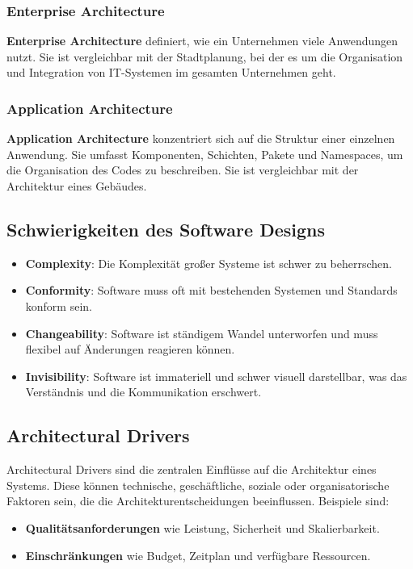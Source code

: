\subsubsection{Enterprise Architecture}

\textbf{Enterprise Architecture} definiert, wie ein Unternehmen viele Anwendungen nutzt. Sie ist vergleichbar mit der Stadtplanung, bei der es um die Organisation und Integration von IT-Systemen im gesamten Unternehmen geht.

\subsubsection{Application Architecture}

\textbf{Application Architecture} konzentriert sich auf die Struktur einer einzelnen Anwendung. Sie umfasst Komponenten, Schichten, Pakete und Namespaces, um die Organisation des Codes zu beschreiben. Sie ist vergleichbar mit der Architektur eines Gebäudes.

\subsection{Schwierigkeiten des Software Designs}

\begin{itemize}
    \item \textbf{Complexity}: Die Komplexität großer Systeme ist schwer zu beherrschen.
    \item \textbf{Conformity}: Software muss oft mit bestehenden Systemen und Standards konform sein.
    \item \textbf{Changeability}: Software ist ständigem Wandel unterworfen und muss flexibel auf Änderungen reagieren können.
    \item \textbf{Invisibility}: Software ist immateriell und schwer visuell darstellbar, was das Verständnis und die Kommunikation erschwert.
\end{itemize}

\subsection{Architectural Drivers}

Architectural Drivers sind die zentralen Einflüsse auf die Architektur eines Systems. Diese können technische, geschäftliche, soziale oder organisatorische Faktoren sein, die die Architekturentscheidungen beeinflussen. Beispiele sind:

\begin{itemize}
    \item \textbf{Qualitätsanforderungen} wie Leistung, Sicherheit und Skalierbarkeit.
    \item \textbf{Einschränkungen} wie Budget, Zeitplan und verfügbare Ressourcen.
\end{itemize}

